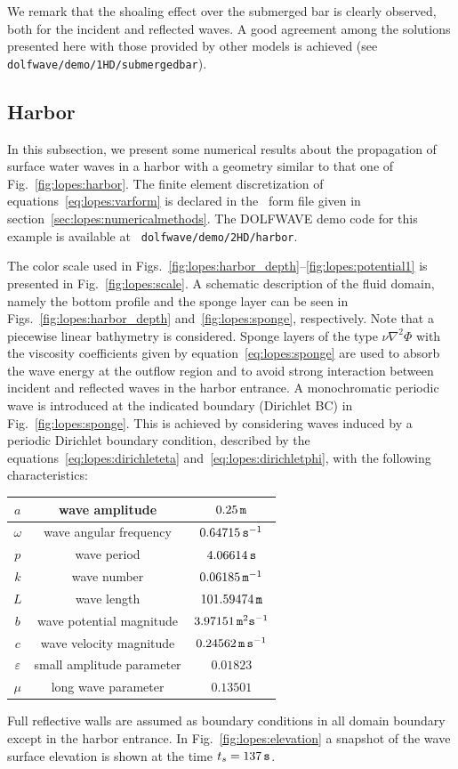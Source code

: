 We remark that the shoaling effect over the submerged bar is
clearly observed, both for the incident and reflected
waves. A good agreement among the solutions presented here
with those provided by other models is achieved (see {\tt
  dolfwave/demo/1HD/submergedbar}).

\subsection{Harbor}
In this subsection, we present some numerical results about
the propagation of surface water waves in a harbor with a
geometry similar to that one of Fig.~\ref{fig:lopes:harbor}.
The finite element discretization of
equations~\eqref{eq:lopes:varform} is declared in the
\ufl\ form file given in
section~\ref{sec:lopes:numericalmethods}.  The DOLFWAVE demo
code for this example is available at {\tt
  dolfwave/demo/2HD/harbor}.

The color scale used in
Figs.~\ref{fig:lopes:harbor_depth}--\ref{fig:lopes:potential1}
is presented in Fig.~\ref{fig:lopes:scale}.  A schematic
description of the fluid domain, namely the bottom profile
and the sponge layer can be seen in
Figs.~\ref{fig:lopes:harbor_depth}
and~\ref{fig:lopes:sponge}, respectively.  Note that a
piecewise linear bathymetry is considered.  Sponge layers of
the type $\nu\nabla^2\Phi$ with the viscosity coefficients
given by equation~\eqref{eq:lopes:sponge} are used to absorb
the wave energy at the outflow region and to avoid strong
interaction between incident and reflected waves in the
harbor entrance.  A monochromatic periodic wave is
introduced at the indicated boundary (Dirichlet BC) in
Fig.~\ref{fig:lopes:sponge}.  This is achieved by
considering waves induced by a periodic Dirichlet boundary
condition, described by the
equations~\eqref{eq:lopes:dirichleteta}
and~\eqref{eq:lopes:dirichletphi}, with the following
characteristics:
\smallskip
\begin{center}
\renewcommand{\arraystretch}{1.3}
\begin{tabular}{|c|c|c|}
\hline $a$ & wave amplitude & $0.25 \,{\tt m}$\\ \hline
$\omega$ & wave angular frequency & $0.64715 \,{\tt
  s}^{-1}$\\ \hline $p$ & wave period & $4.06614 \,{\tt
  s}$\\ \hline $k$ & wave number & $0.06185 \,{\tt
  m}^{-1}$\\ \hline $L$ & wave length & $101.59474 \,{\tt
  m}$\\ \hline $b$ & wave potential magnitude& $3.97151
\,{\tt m}^2{\tt s}^{-1}$\\ \hline $c$ & wave velocity
magnitude& $0.24562 \,{\tt m\, s}^{-1}$ \\ \hline
$\varepsilon$& small amplitude parameter &
$0.01823$\\ \hline $\mu$ & long wave parameter &
$0.13501$\\ \hline
\end{tabular}
\end{center}
\smallskip
Full reflective walls are assumed as boundary conditions in
all domain boundary except in the harbor entrance.  In
Fig.~\ref{fig:lopes:elevation} a snapshot of the wave
surface elevation is shown at the time $t_s=137\,{\tt s}$.

